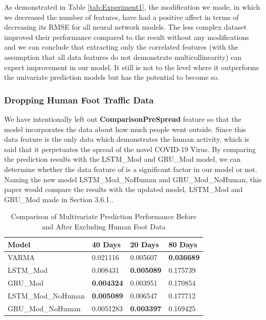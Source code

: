 As demonstrated in Table \ref{tab:Experiment1}, the modification we made, in which we decreased the number of features, have had a positive affect in terms of decreasing its RMSE for all neural network models. The less complex dataset improved their performance compared to the result without any modifications and we can conclude that extracting only the correlated features (with the assumption that all data features do not demonstrate multicollinearity) can expect improvement in our model. It still is not to the level where it outperforms the univariate prediction models but has the potential to become so. 


\subsubsection{Dropping Human Foot Traffic Data}
We have intentionally left out \textbf{ComparisonPreSpread} feature so that the model incorporates the data about how much people went outside. Since this data feature is the only data which demonstrates the human activity, which is said that it perpetuates the spread of the novel COVID-19 Virus. By comparing the prediction results with the LSTM\_Mod and GRU\_Mod model, we can determine whether the data feature of  is a significant factor in our model or not. Naming the new model LSTM\_Mod\_NoHuman and GRU\_Mod\_NoHuman, this paper would compare the results with the updated model, LSTM\_Mod and GRU\_Mod made in Section 3.6.1..  
\begin{table}[ht]
\centering
\caption{\label{tab:Experiment2}Comparison of Multivariate Prediction Performance Before and After Excluding Human Foot Data}
\begin{tabular}{ |p{4cm}||p{2cm}|p{2cm}|p{2cm}| }
 \hline
 Model & 40 Days & 20 Days & 80 Days \\
 \hline
    VARMA & 0.021116 & 0.005607 & \textbf{0.036689} \\
    LSTM\_Mod & 0.008431 & \textbf{0.005089} & 0.175739 \\
    GRU\_Mod & \textbf{0.004324} & 0.003951 & 0.170854 \\
    LSTM\_Mod\_NoHuman & \textbf{0.005089} & 0.006547 & 0.177712\\
    GRU\_Mod\_NoHuman & 0.0051283 & \textbf{0.003397} & 0.169425\\
\hline
\end{tabular}
\end{table}
